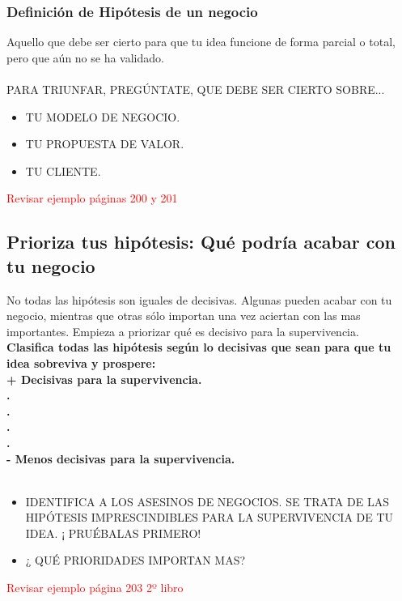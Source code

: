\documentclass[11pt]{book}
\begin{document}
\subsubsection{Definición de Hipótesis de un negocio}
Aquello que debe ser cierto para que tu idea funcione de forma parcial o total, pero que aún no se ha validado.\\\\
PARA TRIUNFAR, PREGÚNTATE, QUE DEBE SER CIERTO SOBRE... 
\begin{itemize}
\item TU MODELO DE NEGOCIO.
\item TU PROPUESTA DE VALOR.
\item TU CLIENTE.
\end{itemize}
\textcolor{red}{Revisar ejemplo páginas 200 y 201}
\subsection{Prioriza tus hipótesis: Qué podría acabar con tu negocio}
No todas las hipótesis son iguales de decisivas. Algunas pueden acabar con tu negocio, mientras que otras sólo importan una vez aciertan con las mas importantes.
Empieza a  priorizar qué es decisivo para la supervivencia.\\
\textbf{Clasifica todas las hipótesis según lo decisivas que sean para que tu idea sobreviva y prospere:\\
+ Decisivas para la supervivencia.\\ 
.\\
.\\
.\\
.\\
- Menos decisivas para la supervivencia. }\\\\
\begin{itemize}
\item IDENTIFICA A LOS ASESINOS DE NEGOCIOS. SE TRATA DE LAS HIPÓTESIS IMPRESCINDIBLES PARA LA SUPERVIVENCIA DE TU IDEA. ¡ PRUÉBALAS PRIMERO!
\item ¿ QUÉ PRIORIDADES IMPORTAN MAS? 
\end{itemize}
\textcolor{red}{Revisar ejemplo página 203 2º libro}
\end{document}
